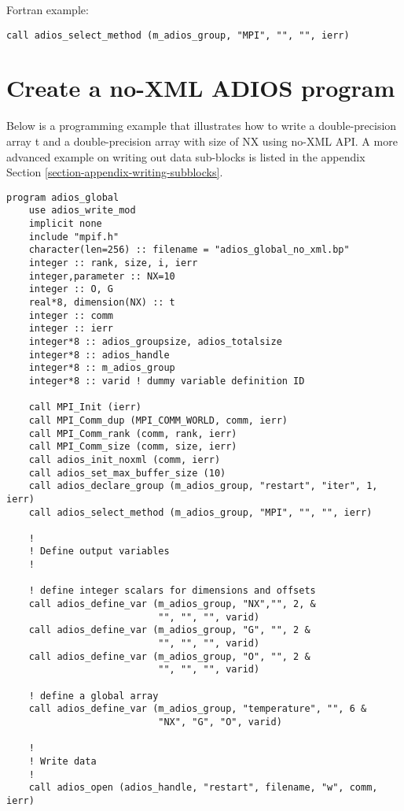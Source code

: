 Fortran example: 
\begin{lstlisting}[alsolanguage=Fortran,caption={},label={}]
call adios_select_method (m_adios_group, "MPI", "", "", ierr)
\end{lstlisting}

\section{Create a no-XML ADIOS program}

Below is a programming example that illustrates how to write a double-precision 
array t and a double-precision array with size of NX using no-XML API.
A more advanced example on writing out data sub-blocks is listed in the 
appendix Section \ref{section-appendix-writing-subblocks}. 

\begin{lstlisting}[alsolanguage=Fortran,caption={ADIOS no-XML example},label={}]
program adios_global 
    use adios_write_mod
    implicit none
    include "mpif.h"
    character(len=256) :: filename = "adios_global_no_xml.bp" 
    integer :: rank, size, i, ierr
    integer,parameter :: NX=10
    integer :: O, G    
    real*8, dimension(NX) :: t 
    integer :: comm
    integer :: ierr
    integer*8 :: adios_groupsize, adios_totalsize
    integer*8 :: adios_handle
    integer*8 :: m_adios_group
    integer*8 :: varid ! dummy variable definition ID

    call MPI_Init (ierr)
    call MPI_Comm_dup (MPI_COMM_WORLD, comm, ierr)
    call MPI_Comm_rank (comm, rank, ierr) 
    call MPI_Comm_size (comm, size, ierr)
    call adios_init_noxml (comm, ierr)
    call adios_set_max_buffer_size (10)
    call adios_declare_group (m_adios_group, "restart", "iter", 1, ierr) 
    call adios_select_method (m_adios_group, "MPI", "", "", ierr)
    
    !
    ! Define output variables
    !

    ! define integer scalars for dimensions and offsets
    call adios_define_var (m_adios_group, "NX","", 2, &
                           "", "", "", varid) 
    call adios_define_var (m_adios_group, "G", "", 2 &
                           "", "", "", varid) 
    call adios_define_var (m_adios_group, "O", "", 2 &
                           "", "", "", varid)
        
    ! define a global array
    call adios_define_var (m_adios_group, "temperature", "", 6 &
                           "NX", "G", "O", varid)

    !
    ! Write data 
    !
    call adios_open (adios_handle, "restart", filename, "w", comm, ierr)
    

\end{lstlisting}
